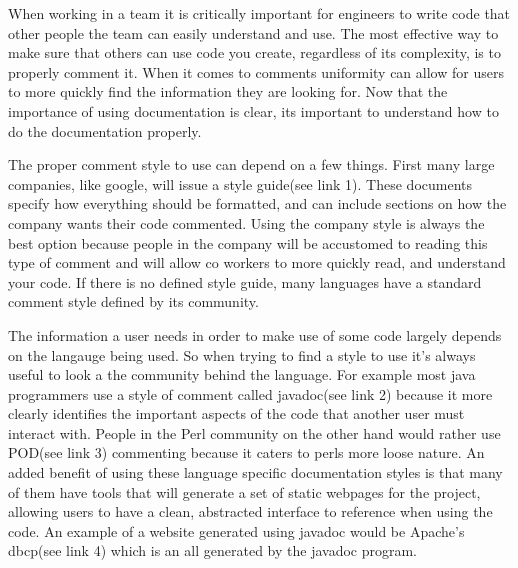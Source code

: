 \documentclass[letterpaper,11pt]{texMemo} %
\begin{document}
\maketitle %


  \indent When working in a team it is critically important for engineers to write code that
  other people the team can easily understand and use. The most effective way to make sure
  that others can use code you create, regardless of its complexity, is to properly comment it.
  When it comes to comments uniformity can allow for users to more quickly find the information
  they are looking for. Now that the importance of using documentation is clear, its important
  to understand how to do the documentation properly.

  \indent The proper comment style to use can depend on a few things. First many large
  companies, like google, will issue a style guide(see link 1). These documents specify
  how everything should be formatted, and can include sections on how the company wants
  their code commented. Using the company style is always the best option because people
  in the company will be accustomed to reading this type of comment and will allow co workers
  to more quickly read, and understand your code. If there is no defined style guide, many
  languages have a standard comment style defined by its community.

  \indent The information a user needs in order to make use of some code largely depends
  on the langauge being used. So when trying to find a style to use it's always useful
  to look a the community behind the language. For example most java programmers use
  a style of comment called javadoc(see link 2) because it more clearly identifies the important
  aspects of the code that another user must interact with. People in the Perl community
  on the other hand would rather use POD(see link 3) commenting because it caters to perls more
  loose nature. An added benefit of using these language specific documentation styles is that
  many of them have tools that will generate a set of static webpages for the project, allowing
  users to have a clean, abstracted interface to reference when using the code. An example of
  a website generated using javadoc would be Apache's dbcp(see link 4) which is an all generated by
  the javadoc program.
\end{document}
